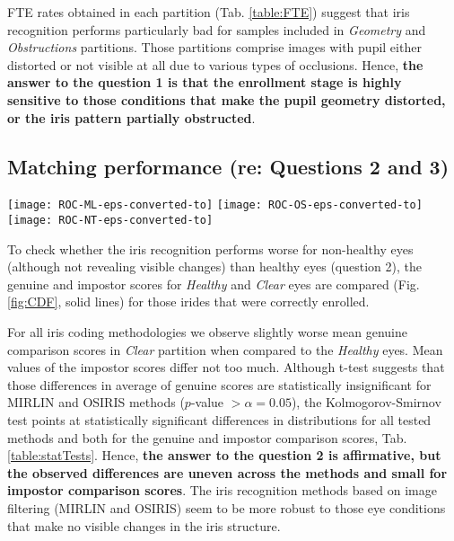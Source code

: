 \documentclass[10pt,twocolumn,letterpaper]{article}
\begin{document}
FTE rates  obtained in each partition (Tab. \ref{table:FTE}) suggest that iris recognition performs particularly bad for samples included in \emph{Geometry} and \emph{Obstructions} partitions. Those partitions comprise images with pupil either distorted or not visible at all due to various types of occlusions. Hence, {\bf the answer to the question 1 is that the enrollment stage is highly sensitive to those conditions that make the pupil geometry distorted, or the iris pattern partially obstructed}.

\subsection{Matching performance (re: Questions 2 and 3)}

\begin{figure*}[!htb]
\centering
\texttt{[image: ROC-ML-eps-converted-to]}\hfill
\texttt{[image: ROC-OS-eps-converted-to]}\hfill
\texttt{[image: ROC-NT-eps-converted-to]}
\caption{Receiver operating characteristics (ROC) for MIRLIN (left), OSIRIS (middle) and VeriEye (right) iris recognition methods.}
\label{fig:CDF}
\end{figure*}

To check whether the iris recognition performs worse for non-healthy eyes (although not revealing visible changes) than healthy eyes (question 2), the genuine and impostor scores for \emph{Healthy} and \emph{Clear} eyes are compared (Fig. \ref{fig:CDF}, solid lines) for those irides that were correctly enrolled. 

For all iris coding methodologies we observe slightly worse mean genuine comparison scores in \emph{Clear} partition when compared to the \emph{Healthy} eyes. Mean values of the impostor scores differ not too much. Although t-test suggests that those differences in average of genuine scores are statistically insignificant for MIRLIN and OSIRIS methods ($p$-value $ > \alpha = 0.05$), the Kolmogorov-Smirnov test points at statistically significant differences in distributions for all tested methods and both for the genuine and impostor comparison scores, Tab. \ref{table:statTests}. Hence, {\bf the answer to the question 2 is affirmative, but the observed differences are uneven across the methods and small for impostor comparison scores}. The iris recognition methods based on image filtering (MIRLIN and OSIRIS) seem to be more robust to those eye conditions that make no visible changes in the iris structure.
\end{document}
